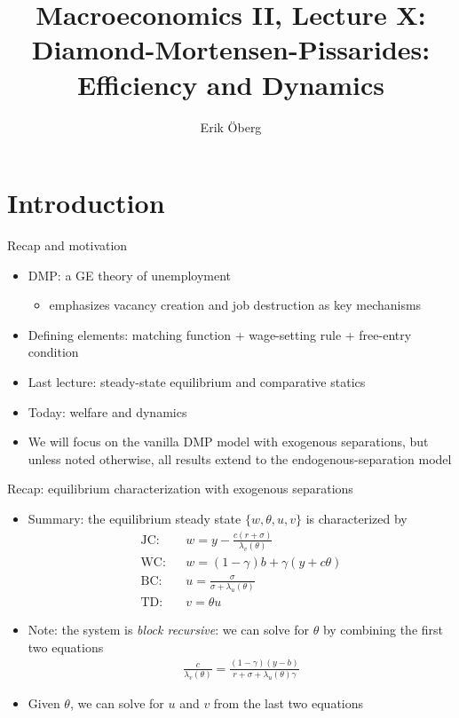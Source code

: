 \documentclass[9pt]{beamer}
\title[DMP dynamics]{Macroeconomics II, Lecture X:\\
	Diamond-Mortensen-Pissarides: Efficiency and Dynamics}
\author{Erik {\"O}berg}
\date{}
\newcommand{\bit}{\begin{itemize}}
\newcommand{\eit}{\end{itemize}}
\begin{document}
	
\begin{frame}[plain]
\titlepage
\end{frame}

\section{Introduction}


\begin{frame}{Recap and motivation}

\bit
\setlength\itemsep{2em}

\item DMP: a GE theory of unemployment
\bit
\item emphasizes vacancy creation and job destruction as key mechanisms
\eit

\item Defining elements: matching function + wage-setting rule + free-entry condition

\item Last lecture: steady-state equilibrium and comparative statics

\item Today: welfare and dynamics

\item We will focus on the vanilla DMP model with exogenous separations, but unless noted otherwise, all results extend to the endogenous-separation model

\eit

\end{frame}


\begin{frame}{Recap: equilibrium characterization with exogenous separations}

\bit
\setlength\itemsep{1em}

\item Summary: the equilibrium steady state $\{w, \theta, u, v\}$ is characterized by
\begin{eqnarray}
\text{JC:} && w = y - \frac{c(r+\sigma)}{\lambda_v(\theta)} \nonumber \\
\text{WC:} && w = (1-\gamma)b + \gamma (y +c \theta) \nonumber \\
\text{BC:} && u = \frac{\sigma}{\sigma + \lambda_u(\theta)} \nonumber \\
\text{TD:} && v = \theta u \nonumber
\end{eqnarray}

\item Note: the system is \emph{block recursive}: we can solve for $\theta$ by combining the first two equations
\begin{eqnarray}
\frac{c}{\lambda_v(\theta)} = \frac{(1-\gamma)(y-b)}{r + \sigma + \lambda_u(\theta) \gamma} \nonumber
\end{eqnarray} 


\item Given $\theta$, we can solve for $u$ and $v$ from the last two equations

\eit
\end{frame}
\end{document}
